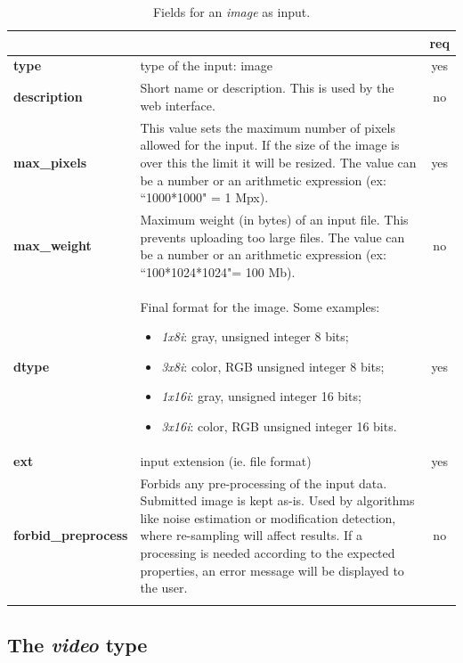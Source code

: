 \begin{longtable}{|>{\bf}L{\linewidth}|L{\linewidth}|c|}
\hline
{}     &  & {\bf req} \tabularnewline 
\hline \hline
 type         & type of the input: image & yes \\ \hline
 description  & Short name or description. This is used by the web interface. & no \\ \hline
 max\_pixels  & This value sets the maximum number of pixels allowed for the input. If the size of the image is over this the limit it will be resized. The value can be a number or an arithmetic expression (ex:  ``1000*1000" = 1 Mpx).  & yes \\ \hline
 max\_weight   & Maximum weight (in bytes) of an input file. This prevents uploading too large files. The value can be a number or an arithmetic expression (ex: ``100*1024*1024"= 100 Mb). & no \\ \hline
 dtype        & Final format for the image. Some examples:
\begin{itemize}
  \setlength\itemsep{-0.5em}
  \item \textit{1x8i}: gray, unsigned integer 8 bits;
  \item \textit{3x8i}: color, RGB unsigned integer 8 bits;
  \item \textit{1x16i}: gray, unsigned integer 16 bits;
  \item \textit{3x16i}: color, RGB unsigned integer 16 bits.
\end{itemize} 
 & yes \\ \hline
 ext          & input extension (ie. file format) & yes \\ \hline
forbid\_preprocess & Forbids any pre-processing of the input data. 
Submitted image is kept as-is. Used by algorithms like noise estimation or modification detection, where re-sampling will affect results. 
If a processing is needed according to the expected properties, an error message will be displayed to the user.
& no \\ \hline
\caption{Fields for an \emph{image} as input.}
\end{longtable}

\subsection{The \emph{video} type}

